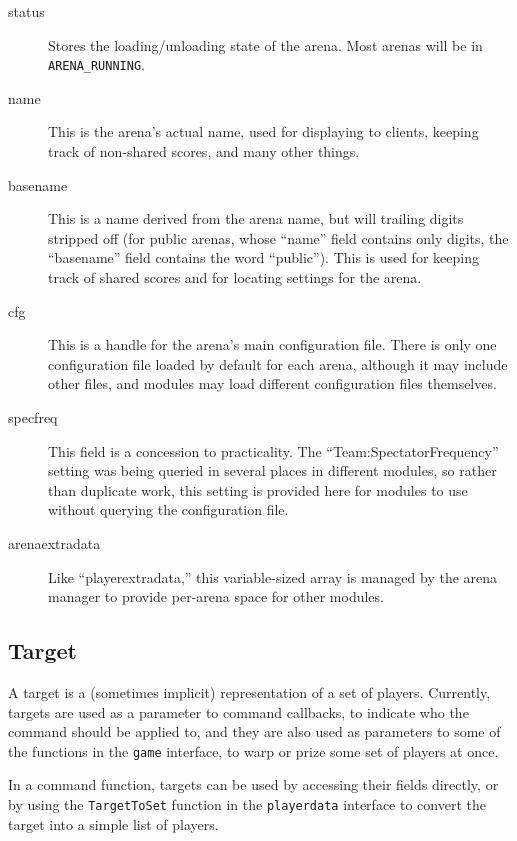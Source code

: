 \documentclass{article}
\begin{document}
\begin{description}

\item[status] Stores the loading/unloading state of the arena. Most
arenas will be in \verb/ARENA_RUNNING/.

\item[name] This is the arena's actual name, used for displaying to
clients, keeping track of non-shared scores, and many other things.

\item[basename] This is a name derived from the arena name, but will
trailing digits stripped off (for public arenas, whose ``name'' field
contains only digits, the ``basename'' field contains the word
``public''). This is used for keeping track of shared scores and for
locating settings for the arena.

\item[cfg] This is a handle for the arena's main configuration file.
There is only one configuration file loaded by default for each arena,
although it may include other files, and modules may load different
configuration files themselves.

\item[specfreq] This field is a concession to practicality. The
``Team:SpectatorFrequency'' setting was being queried in several places
in different modules, so rather than duplicate work, this setting is
provided here for modules to use without querying the configuration
file.

\item[arenaextradata] Like ``playerextradata,'' this variable-sized
array is managed by the arena manager to provide per-arena space for
other modules.

\end{description}


\subsection{Target}

A target is a (sometimes implicit) representation of a set of players.
Currently, targets are used as a parameter to command callbacks, to
indicate who the command should be applied to, and they are also used as
parameters to some of the functions in the \verb/game/ interface, to
warp or prize some set of players at once.

In a command function, targets can be used by accessing their fields
directly, or by using the \verb/TargetToSet/ function in the
\verb/playerdata/ interface to convert the target into a simple list of
players.
\end{document}
